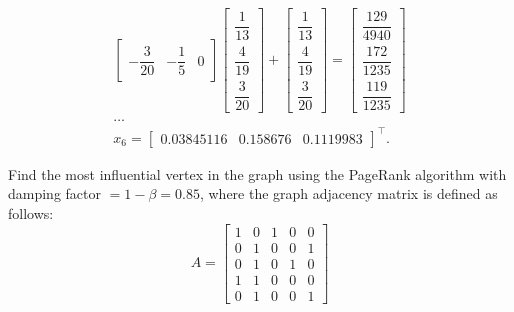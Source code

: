 \documentclass[12pt]{report}
\begin{document}
\begin{solution}
\[\begin{array}{c}
\begin{bmatrix}
               -\dfrac{3}{20} & -\dfrac{1}{5} & 0
            \end{bmatrix}  \begin{bmatrix}
               \dfrac{1}{13}\\[0.5cm]
               \dfrac{4}{19}\\[0.5cm]
               \dfrac{3}{20}
            \end{bmatrix}  + \begin{bmatrix}
               \dfrac{1}{13}\\[0.5cm]
               \dfrac{4}{19}\\[0.5cm]
               \dfrac{3}{20}
            \end{bmatrix} = \begin{bmatrix}
               \dfrac{129}{4940} \\[0.5cm]
               \dfrac{172}{1235} \\[0.5cm]
               \dfrac{119}{1235}
            \end{bmatrix} \\[2cm]
            \ldots \\
            x_6 = \begin{bmatrix}
               0.03845116 & 0.158676 & 0.1119983
            \end{bmatrix}^\intercal.
         \end{array} 
   \]
\end{solution}

\begin{problem}{}
   Find the most influential vertex in the graph using the PageRank algorithm with damping factor $ = 1 - \beta = 0.85$, where the graph adjacency matrix is defined as follows:
   \[
      A = \begin{bmatrix}
         1 & 0 & 1 & 0 & 0\\
         0 & 1 & 0 & 0 & 1\\
         0 & 1 & 0 & 1 & 0\\
         1 & 1 & 0 & 0 & 0\\
         0 & 1 & 0 & 0 & 1
      \end{bmatrix}
   \]
\end{problem}
\end{document}
